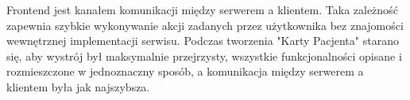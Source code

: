 Frontend jest kanałem komunikacji między serwerem a klientem. Taka zależność zapewnia szybkie wykonywanie akcji
zadanych przez użytkownika bez znajomości wewnętrznej implementacji serwisu.
Podczas tworzenia "Karty Pacjenta" starano się, aby wystrój był maksymalnie przejrzysty,
wszystkie funkcjonalności opisane i rozmieszczone w jednoznaczny sposób, a komunikacja między serwerem a klientem była jak najszybsza.